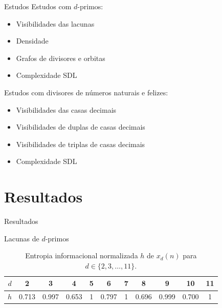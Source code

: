 \documentclass[12pt,
aspectratio=169,
]{beamer}
\begin{document}
\begin{frame}{Estudos}
Estudos com $d$-primos:
\begin{itemize}
    \item Visibilidades das lacunas
    \item Densidade
    \item Grafos de divisores e orbitas
    \item Complexidade SDL
\end{itemize}

\vspace{10pt}
Estudos com divisores de n\'umeros naturais e felizes:
\begin{itemize}
    \item Visibilidades das casas decimais
    \item Visibilidades de duplas de casas decimais
    \item Visibilidades de triplas de casas decimais
    \item Complexidade SDL
\end{itemize}
\end{frame}


\section{Resultados}

\begin{nobarframe}
\vfill
\begin{center}
\Large
Resultados
\end{center}
\vfill
\end{nobarframe}

\begin{frame}{Lacunas de $d$-primos}
    
\begin{table}[ht]
\begin{center}
\caption{Entropia informacional normalizada $h$ de $x_d(n)$ para
$d \in \{2, 3, \ldots, 11\}$.}
\small
\begin{tabular}{|c|c|c|c|c|c|c|c|c|c|c|} \hline
        $d$ & 2 & 3 & 4 & 5 & 6 & 7 & 8 & 9 & 10 & 11\\ \hline
        $h$ & 0.713 & 0.997 & 0.653 & 1 & 0.797 & 1 & 0.696 &
        0.999 & 0.700 & 1\\
        \hline
    \end{tabular}
    \label{entropies}
\end{center}
\end{table}
\end{frame}
\end{document}
